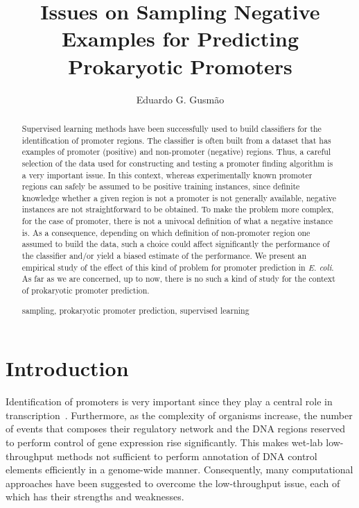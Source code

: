 \documentclass[runningheads,a4paper]{llncs}
\newcommand{\keywords}[1]{\par\addvspace\baselineskip
\noindent\keywordname\enspace\ignorespaces#1}
\begin{document}
\mainmatter

\title{Issues on Sampling Negative Examples for Predicting Prokaryotic Promoters}


\author{Eduardo G. Gusm\~{a}o}


\maketitle

\begin{abstract}
Supervised learning methods have been successfully used to build classifiers for the identification of promoter regions. The classifier is often built from a dataset that has examples of promoter (positive) and non-promoter  (negative)  regions.  Thus, a careful selection of the data  used for constructing and testing a promoter finding algorithm is a very important issue.  In this context, whereas experimentally known promoter regions can safely be assumed to be positive training instances,   since  definite knowledge whether a given region is not a promoter  is not generally available,  negative instances are not straightforward to be obtained. To make the problem more complex, for the case of promoter, there is not  a univocal definition of what a negative instance is. As a consequence, depending on which definition of non-promoter region one assumed to  build  the data, such a choice  could affect  significantly the performance of the classifier and/or yield a biased estimate of the performance. We present an empirical study of the effect of this kind of problem for promoter prediction in {\it E. coli}. As far as we are concerned, up to now, there is no such a  kind of study for the context of prokaryotic promoter prediction.
\keywords{sampling, prokaryotic promoter prediction, supervised learning}
\end{abstract}

\section{Introduction}
Identification of promoters is very important since they play a central role in transcription~\cite{maston2006}. Furthermore, as the complexity of organisms increase, the number of events that composes their regulatory network and the DNA regions reserved to perform control of gene expression rise significantly. This  makes wet-lab low-throughput methods not sufficient to perform annotation of DNA control elements efficiently in a genome-wide manner. Consequently, many computational approaches have been suggested to overcome the low-throughput issue, each of which has their strengths and weaknesses.
\end{document}
